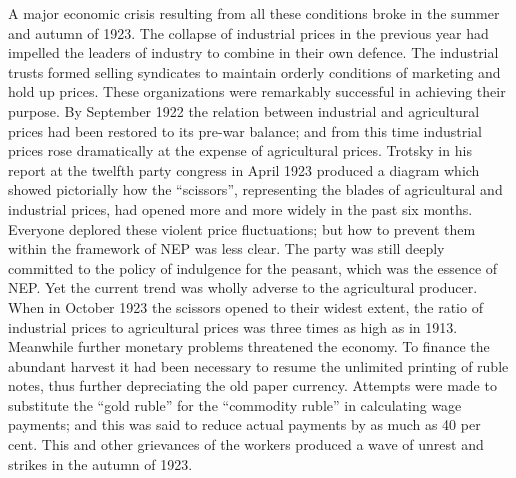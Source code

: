 A major economic crisis resulting from all these conditions broke in the summer and autumn of 1923. The collapse of industrial prices in the previous year had impelled the leaders of industry to combine in their own defence. The industrial trusts formed selling syndicates to maintain orderly conditions of marketing and hold up prices. These organizations were remarkably successful in achieving their purpose. By September 1922 the relation between industrial and agricultural prices had been restored to its pre-war balance; and from this time industrial prices rose dramatically at the expense of agricultural prices. Trotsky in his report at the twelfth party congress in April 1923 produced a diagram which showed pictorially how the ``scissors'', representing the blades of agricultural and industrial prices, had opened more and more widely in the past six months. Everyone deplored these violent price fluctuations; but how to prevent them within the framework of NEP was less clear. The party was still deeply committed to the policy of indulgence for the peasant, which was the essence of NEP. Yet the current trend was wholly adverse to the agricultural producer. When in October 1923 the scissors opened to their widest extent, the ratio of industrial prices to agricultural prices was three times as high as in 1913. Meanwhile further monetary problems threatened the economy. To finance the abundant harvest it had been necessary to resume the unlimited printing of ruble notes, thus further depreciating the old paper currency. Attempts were made to substitute the ``gold ruble'' for the ``commodity ruble'' in calculating wage payments; and this was said to reduce actual payments by as much as 40 per cent. This and other grievances of the workers produced a wave of unrest and strikes in the autumn of 1923. 

